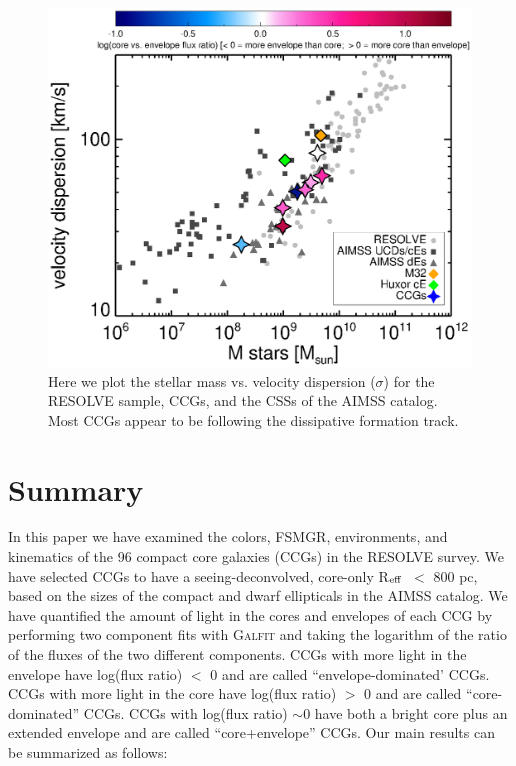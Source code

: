 \documentclass[iop,apj]{emulateapj}
\newcommand{\Reff}{R$_{\rm eff}$}
\begin{document}
\begin{figure}[t!]
\begin{center}
\includegraphics{faber-jackson_resolvesigmas.eps}
\caption{Here we plot the stellar mass vs. velocity dispersion ($\sigma$) for the RESOLVE sample, CCGs, and the CSSs of the AIMSS catalog. Most CCGs appear to be following the dissipative formation track.}
\label{fig:sigma}
\end{center}
\end{figure}




\section{Summary}
\label{conclusions}

\noindent In this paper we have examined the colors, FSMGR, environments, and kinematics of the 96 compact core galaxies (CCGs) in the RESOLVE survey. We have selected CCGs to have a seeing-deconvolved, core-only \Reff\ $<$ 800 pc, based on the sizes of the compact and dwarf ellipticals in the AIMSS catalog. We have quantified the amount of light in the cores and envelopes of each CCG by performing two component fits with \textsc{Galfit} and taking the logarithm of the ratio of the fluxes of the two different components. CCGs with more light in the envelope have log(flux ratio) $<$ 0 and are called ``envelope-dominated' CCGs. CCGs with more light in the core have log(flux ratio) $>$ 0 and are called ``core-dominated'' CCGs. CCGs with log(flux ratio) $\sim 0$ have both a bright core plus an extended envelope and are called ``core+envelope'' CCGs. Our main results can be summarized as follows:
\end{document}
